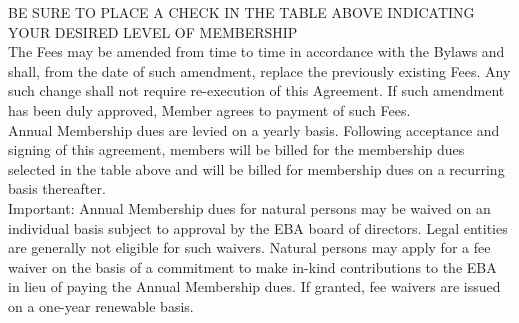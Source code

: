 \documentclass{article}
\begin{document}
BE SURE TO PLACE A CHECK IN THE TABLE ABOVE INDICATING YOUR DESIRED LEVEL OF MEMBERSHIP \\

The Fees may be amended from time to time in accordance with the Bylaws and shall, from the date of such amendment, replace the previously existing Fees. Any such change shall not require re-execution of this Agreement. 
If such amendment has been duly approved, Member agrees to payment of such Fees. \\

Annual Membership dues are levied on a yearly basis. 
Following acceptance and signing of this agreement, members will be billed for the membership dues selected in the table above and will be billed for membership dues on a recurring basis thereafter. \\

Important: Annual Membership dues for natural persons may be waived on an individual basis subject to approval by the EBA board of directors. 
Legal entities are generally not eligible for such waivers. 
Natural persons may apply for a fee waiver on the basis of a commitment to make in-kind contributions to the EBA in lieu of paying the Annual Membership dues. 
If granted, fee waivers are issued on a one-year renewable basis. \\


	
\newpage
\end{document}
